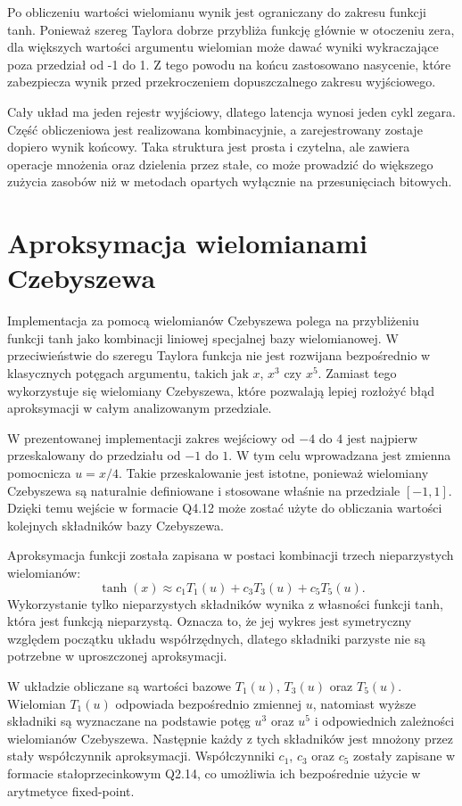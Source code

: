 \documentclass[12pt, a4paper, oneside]{scrreprt}
\begin{document}
Po obliczeniu wartości wielomianu wynik jest ograniczany do zakresu funkcji tanh.
Ponieważ szereg Taylora dobrze przybliża funkcję głównie w otoczeniu zera, dla większych
wartości argumentu wielomian może dawać wyniki wykraczające poza przedział od -1 do 1.
Z tego powodu na końcu zastosowano nasycenie, które zabezpiecza wynik przed przekroczeniem
dopuszczalnego zakresu wyjściowego.

Cały układ ma jeden rejestr wyjściowy, dlatego latencja wynosi jeden cykl zegara. Część obliczeniowa jest realizowana kombinacyjnie, a zarejestrowany zostaje dopiero wynik końcowy. Taka struktura jest prosta i czytelna, ale zawiera operacje mnożenia oraz dzielenia przez stałe, co może prowadzić do większego zużycia zasobów niż w metodach opartych wyłącznie na przesunięciach bitowych.


\section{Aproksymacja wielomianami Czebyszewa}

Implementacja za pomocą wielomianów Czebyszewa polega na przybliżeniu funkcji tanh jako
kombinacji liniowej specjalnej bazy wielomianowej. W przeciwieństwie do szeregu Taylora
funkcja nie jest rozwijana bezpośrednio w klasycznych potęgach argumentu, takich
jak $x$, $x^3$ czy $x^5$. Zamiast tego wykorzystuje się wielomiany Czebyszewa,
które pozwalają lepiej rozłożyć błąd aproksymacji w całym analizowanym przedziale.

W prezentowanej implementacji zakres wejściowy od $-4$ do $4$ jest najpierw przeskalowany
do przedziału od $-1$ do $1$. W tym celu wprowadzana jest zmienna pomocnicza $u = x/4$.
Takie przeskalowanie jest istotne, ponieważ wielomiany Czebyszewa są naturalnie definiowane
i stosowane właśnie na przedziale $[-1, 1]$. Dzięki temu wejście w formacie Q4.12 może zostać
użyte do obliczania wartości kolejnych składników bazy Czebyszewa.

Aproksymacja funkcji została zapisana w postaci kombinacji trzech nieparzystych wielomianów:
\[
\tanh(x) \approx c_1 T_1(u) + c_3 T_3(u) + c_5 T_5(u).
\]
Wykorzystanie tylko nieparzystych składników wynika z własności funkcji tanh, która jest
funkcją nieparzystą. Oznacza to, że jej wykres jest symetryczny względem początku układu
współrzędnych, dlatego składniki parzyste nie są potrzebne w uproszczonej aproksymacji.

W układzie obliczane są wartości bazowe $T_1(u)$, $T_3(u)$ oraz $T_5(u)$. Wielomian $T_1(u)$
odpowiada bezpośrednio zmiennej $u$, natomiast wyższe składniki są wyznaczane na podstawie
potęg $u^3$ oraz $u^5$ i odpowiednich zależności wielomianów Czebyszewa. Następnie każdy z
tych składników jest mnożony przez stały współczynnik aproksymacji. Współczynniki
$c_1$, $c_3$ oraz $c_5$ zostały zapisane w formacie stałoprzecinkowym Q2.14,
co umożliwia ich bezpośrednie użycie w arytmetyce fixed-point.
\end{document}
